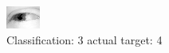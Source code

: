 \begin{figure}[h!]
\begin{center}
\includegraphics[width=0.60\columnwidth]{figures/ID2447_class_3_target_4.png}
\end{center}
\caption{ Classification: 3 actual target: 4}
\label{fig:ID2447_class_3_target_4}
\end{figure}

